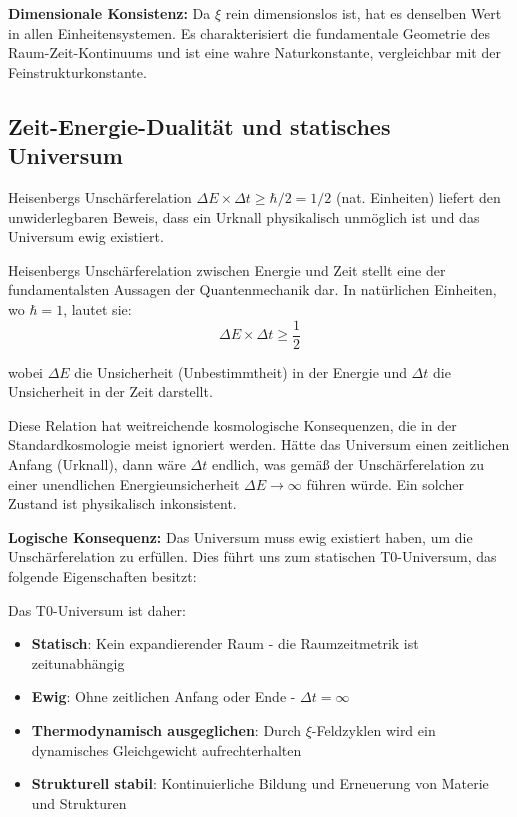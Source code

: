 \documentclass[12pt,a4paper]{article}
\theoremstyle{definition}
\theoremstyle{remark}
\begin{document}
	\textbf{Dimensionale Konsistenz:} Da $\xi$ rein dimensionslos ist, hat es denselben Wert in allen Einheitensystemen. Es charakterisiert die fundamentale Geometrie des Raum-Zeit-Kontinuums und ist eine wahre Naturkonstante, vergleichbar mit der Feinstrukturkonstante.
	
	\subsection{Zeit-Energie-Dualit\"at und statisches Universum}
	
	\begin{important}
		Heisenbergs Unsch\"arferelation $\Delta E \times \Delta t \geq \hbar/2 = 1/2$ (nat. Einheiten) liefert den unwiderlegbaren Beweis, dass ein Urknall physikalisch unm\"oglich ist und das Universum ewig existiert.
	\end{important}
	
	Heisenbergs Unsch\"arferelation zwischen Energie und Zeit stellt eine der fundamentalsten Aussagen der Quantenmechanik dar. In nat\"urlichen Einheiten, wo $\hbar = 1$, lautet sie:
	\begin{equation}
		\Delta E \times \Delta t \geq \frac{1}{2}
	\end{equation}
	
	wobei $\Delta E$ die Unsicherheit (Unbestimmtheit) in der Energie und $\Delta t$ die Unsicherheit in der Zeit darstellt.
	
	Diese Relation hat weitreichende kosmologische Konsequenzen, die in der Standardkosmologie meist ignoriert werden. H\"atte das Universum einen zeitlichen Anfang (Urknall), dann w\"are $\Delta t$ endlich, was gem\"a\ss{} der Unsch\"arferelation zu einer unendlichen Energieunsicherheit $\Delta E \to \infty$ f\"uhren w\"urde. Ein solcher Zustand ist physikalisch inkonsistent.
	
	\textbf{Logische Konsequenz:} Das Universum muss ewig existiert haben, um die Unsch\"arferelation zu erf\"ullen. Dies f\"uhrt uns zum statischen T0-Universum, das folgende Eigenschaften besitzt:
	
	Das T0-Universum ist daher:
	\begin{itemize}
		\item \textbf{Statisch}: Kein expandierender Raum - die Raumzeitmetrik ist zeitunabh\"angig
		\item \textbf{Ewig}: Ohne zeitlichen Anfang oder Ende - $\Delta t = \infty$
		\item \textbf{Thermodynamisch ausgeglichen}: Durch $\xi$-Feldzyklen wird ein dynamisches Gleichgewicht aufrechterhalten
		\item \textbf{Strukturell stabil}: Kontinuierliche Bildung und Erneuerung von Materie und Strukturen
	\end{itemize}
	
\end{document}
